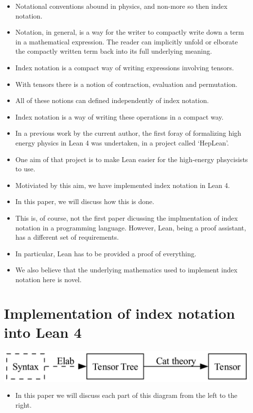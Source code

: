 \documentclass[a4paper, 11pt]{article}
\begin{document}
\begin{itemize}
\item Notational conventions abound in physics, and non-more so then index notation. 
\item Notation, in general, is a way for the writer to compactly write down a term in a 
  mathematical expression. The reader can implicitly unfold or elborate the compactly written term 
  back into its full underlying meaning. 
\item Index notation is a compact way of writing expressions involving tensors.
\item With tensors there is a notion of contraction, evaluation and permutation.
\item All of these notions can defined independently of index notation.
\item Index notation is a way of writing these operations in a compact way.
\item In a previous work by the current author, the first foray of formalizing high energy physics 
  in Lean 4 was undertaken, in a project called `HepLean'.
\item One aim of that project is to make Lean easier for the high-energy phsycisists to use. 
\item Motiviated by this aim, we have implemented index notation in Lean 4.
\item In this paper, we will discuss how this is done.
\item This is, of course, not the first paper dicussing the implmentation of index notation in a 
  programming language. However, Lean, being a proof assistant, has a different set of requirements. 
\item In particular, Lean has to be provided a proof of everything. 
\item We also believe that the underlying mathematics used to implement index notation here 
 is novel. 
\end{itemize}

\section{Implementation of index notation into Lean 4}
\includegraphics[width=\textwidth]{overviewFlow.png}
\begin{itemize}
  \item In this paper we will discuss each part of this diagram from the left to the right.
\end{itemize}
\end{document}
